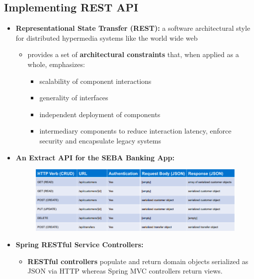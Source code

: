 \documentclass[ieeetran]{article}
\begin{document}
\subsection{Implementing REST API} %
\label{sub:implementing_rEST_aPI}
\begin{itemize}
  \item \textbf{Representational State Transfer (REST):} a software architectural style for distributed hypermedia systems like the world wide web
	  \begin{itemize}
	    \item provides a set of \textbf{architectural constraints} that, when applied as a whole, emphasizes:
		    \begin{itemize}
		      \item scalability of component interactions
			\item generality of interfaces
		\item independent deployment of components
			\item intermediary components to reduce interaction latency, enforce security and encapsulate legacy systems
		    \end{itemize}
	  \end{itemize}
\item \textbf{An Extract API for the SEBA Banking App:}
	\begin{figure}[h!]
	  \centering
	  \includegraphics[width=1.0\linewidth]{sebabankapi.png}
	  \label{fig:sebabankapi_png}
	\end{figure}

\pagebreak
\item \textbf{Spring RESTful Service Controllers:}
	\begin{itemize}
	  \item \textbf{RESTful controllers} populate and return domain objects serialized as JSON via HTTP whereas Spring MVC controllers return views.
	\end{itemize}


\end{itemize}
\end{document}
